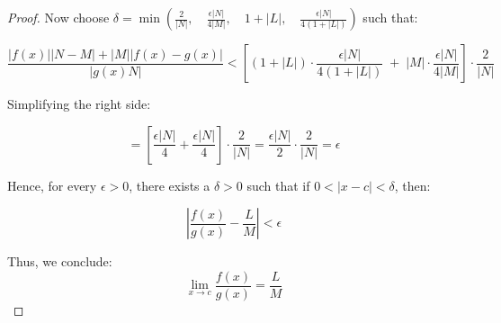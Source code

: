 \documentclass{article}
\begin{document}
\begin{proof}
Now choose $
\delta = \min \left(
\frac{2}{|N|}, \quad
\frac{\epsilon |N|}{4|M|}, \quad
1 + |L|, \quad
\frac{\epsilon |N|}{4(1 + |L|)}
\right) $ such that:

\[
\frac{|f(x)||N - M| + |M||f(x) - g(x)|}{|g(x)N|}
< \left[
(1 + |L|) \cdot \frac{\epsilon |N|}{4(1 + |L|)} \; + \; |M| \cdot \frac{\epsilon |N|}{4|M|}
\right] \cdot \frac{2}{|N|}
\]

Simplifying the right side:

\[
= \left[ \frac{\epsilon |N|}{4} + \frac{\epsilon |N|}{4} \right] \cdot \frac{2}{|N|}
= \frac{\epsilon |N|}{2} \cdot \frac{2}{|N|}
= \epsilon
\]

Hence, for every \( \epsilon > 0 \), there exists a \( \delta > 0 \) such that if \( 0 < |x - c| < \delta \), then:

\[
\left| \frac{f(x)}{g(x)} - \frac{L}{M} \right| < \epsilon
\]

Thus, we conclude:
\[
\lim_{x \to c} \frac{f(x)}{g(x)} = \frac{L}{M}
\]

\end{proof}
\end{document}
